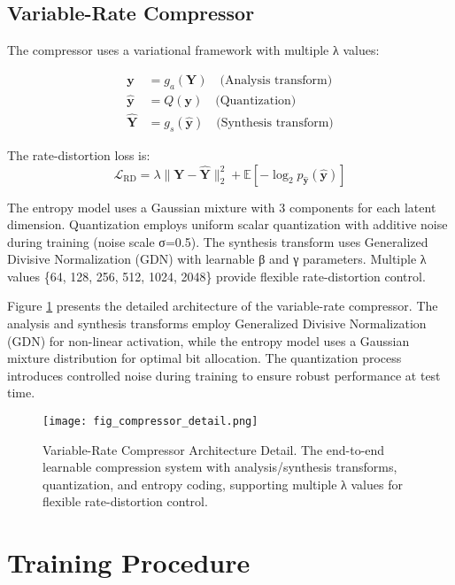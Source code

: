 \documentclass[conference]{IEEEtran}
\begin{document}
\subsection{Variable-Rate Compressor}

The compressor uses a variational framework with multiple λ values:

\begin{align}
\mathbf{y} &= g_a(\mathbf{Y}) \quad \text{(Analysis transform)} \\
\hat{\mathbf{y}} &= Q(\mathbf{y}) \quad \text{(Quantization)} \\
\hat{\mathbf{Y}} &= g_s(\hat{\mathbf{y}}) \quad \text{(Synthesis transform)}
\end{align}

The rate-distortion loss is:
\begin{equation}
\mathcal{L}_{\text{RD}} = \lambda \|\mathbf{Y} - \hat{\mathbf{Y}}\|_2^2 + \mathbb{E}[-\log_2 p_{\hat{\mathbf{y}}}(\hat{\mathbf{y}})]
\end{equation}

The entropy model uses a Gaussian mixture with 3 components for each latent dimension. Quantization employs uniform scalar quantization with additive noise during training (noise scale σ=0.5). The synthesis transform uses Generalized Divisive Normalization (GDN) with learnable β and γ parameters. Multiple λ values \{64, 128, 256, 512, 1024, 2048\} provide flexible rate-distortion control.

Figure \ref{fig:compressor_detail} presents the detailed architecture of the variable-rate compressor. The analysis and synthesis transforms employ Generalized Divisive Normalization (GDN) for non-linear activation, while the entropy model uses a Gaussian mixture distribution for optimal bit allocation. The quantization process introduces controlled noise during training to ensure robust performance at test time.

\begin{figure}[htbp]
\centering
\texttt{[image: fig\_compressor\_detail.png]}
\caption{Variable-Rate Compressor Architecture Detail. The end-to-end learnable compression system with analysis/synthesis transforms, quantization, and entropy coding, supporting multiple λ values for flexible rate-distortion control.}
\label{fig:compressor_detail}
\end{figure}

\section{Training Procedure}
\end{document}
